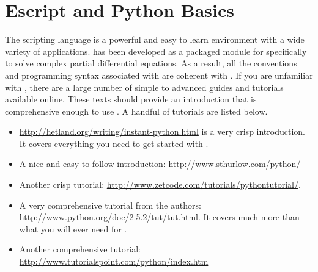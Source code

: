
%
%
%

\section{Escript and Python Basics} \label{sec:escpybas}

The \pyt scripting language is a powerful and easy to learn environment with a wide variety of applications. \esc has been developed as a packaged module for \pyt specifically to solve complex partial differential equations. As a result, all the conventions and programming syntax associated with \pyt are coherent with \esc. If you are unfamiliar with \pyt, there are a large number of simple to advanced guides and tutorials available online. These texts should provide an introduction that is comprehensive enough to use \esc. A handful of \pyt tutorials are listed below.
\begin{itemize}
\item \url{http://hetland.org/writing/instant-python.html} is a very crisp introduction. It covers everything you need to get started with \esc.
\item A nice and easy to follow introduction: \url{http://www.sthurlow.com/python/}
\item Another crisp tutorial: \url{http://www.zetcode.com/tutorials/pythontutorial/}. 
\item A very comprehensive tutorial from the \pyt authors: \url{http://www.python.org/doc/2.5.2/tut/tut.html}. It covers much more than what you will ever need for \esc.
\item Another comprehensive tutorial: \url{http://www.tutorialspoint.com/python/index.htm}
\end{itemize} 

